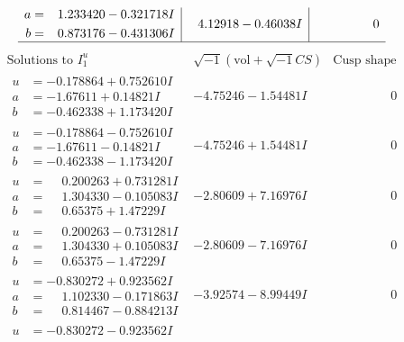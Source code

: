 \documentclass[1p]{elsarticle_modified}
\theoremstyle{definition}
\newcommand{\I}{\sqrt{-1}}
\begin{document}
$$\begin{array}{c|c|c}
\begin{aligned}
a &= \phantom{-}1.233420 - 0.321718 I \\
b &= \phantom{-}0.873176 - 0.431306 I\end{aligned}
 & \phantom{-}4.12918 - 0.46038 I & \phantom{-0.000000 } 0\\
 \hline 
 \end{array}$$\newpage$$\begin{array}{c|c|c}  
\text{Solutions to }I^u_{1}& \I (\text{vol} + \sqrt{-1}CS) & \text{Cusp shape}\\
 \hline 
\begin{aligned}
u &= -0.178864 + 0.752610 I \\
a &= -1.67611 + 0.14821 I \\
b &= -0.462338 + 1.173420 I\end{aligned}
 & -4.75246 - 1.54481 I & \phantom{-0.000000 } 0 \\ \hline\begin{aligned}
u &= -0.178864 - 0.752610 I \\
a &= -1.67611 - 0.14821 I \\
b &= -0.462338 - 1.173420 I\end{aligned}
 & -4.75246 + 1.54481 I & \phantom{-0.000000 } 0 \\ \hline\begin{aligned}
u &= \phantom{-}0.200263 + 0.731281 I \\
a &= \phantom{-}1.304330 - 0.105083 I \\
b &= \phantom{-}0.65375 + 1.47229 I\end{aligned}
 & -2.80609 + 7.16976 I & \phantom{-0.000000 } 0 \\ \hline\begin{aligned}
u &= \phantom{-}0.200263 - 0.731281 I \\
a &= \phantom{-}1.304330 + 0.105083 I \\
b &= \phantom{-}0.65375 - 1.47229 I\end{aligned}
 & -2.80609 - 7.16976 I & \phantom{-0.000000 } 0 \\ \hline\begin{aligned}
u &= -0.830272 + 0.923562 I \\
a &= \phantom{-}1.102330 - 0.171863 I \\
b &= \phantom{-}0.814467 - 0.884213 I\end{aligned}
 & -3.92574 - 8.99449 I & \phantom{-0.000000 } 0 \\ \hline\begin{aligned}
u &= -0.830272 - 0.923562 I \\

\end{aligned}
\end{array}$$
\end{document}
